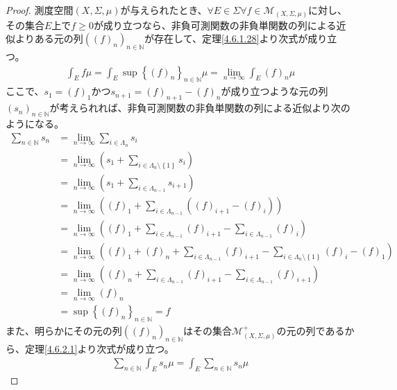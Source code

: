 \documentclass[dvipdfmx]{jsarticle}
\begin{document}
\begin{proof}
測度空間$(X,\varSigma,\mu)$が与えられたとき、$\forall E \in \varSigma\forall f \in \mathcal{M}_{(X,\varSigma,\mu)}$に対し、その集合$E$上で$f \geq 0$が成り立つなら、非負可測関数の非負単関数の列による近似よりある元の列$\left( (f)_{n} \right)_{n \in \mathbb{N}}$が存在して、定理\ref{4.6.1.28}より次式が成り立つ。
\begin{align*}
\int_{E} {f\mu} = \int_{E} {\sup\left\{ (f)_{n} \right\}_{n \in \mathbb{N}}\mu} = \lim_{n \rightarrow \infty}{\int_{E} {(f)_{n}\mu}}
\end{align*}
ここで、$s_{1} = (f)_{1}$かつ$s_{n + 1} = (f)_{n + 1} - (f)_{n}$が成り立つような元の列$\left( s_{n} \right)_{n \in \mathbb{N}}$が考えられれば、非負可測関数の非負単関数の列による近似より次のようになる。
\begin{align*}
\sum_{n \in \mathbb{N}} s_{n} &= \lim_{n \rightarrow \infty}{\sum_{i \in \varLambda_{n}} s_{i}}\\
&= \lim_{n \rightarrow \infty}\left( s_{1} + \sum_{i \in \varLambda_{n} \setminus \left\{ 1 \right\}} s_{i} \right)\\
&= \lim_{n \rightarrow \infty}\left( s_{1} + \sum_{i \in \varLambda_{n - 1}} s_{i + 1} \right)\\
&= \lim_{n \rightarrow \infty}\left( (f)_{1} + \sum_{i \in \varLambda_{n - 1}} \left( (f)_{i + 1} - (f)_{i} \right) \right)\\
&= \lim_{n \rightarrow \infty}\left( (f)_{1} + \sum_{i \in \varLambda_{n - 1}} (f)_{i + 1} - \sum_{i \in \varLambda_{n - 1}} (f)_{i} \right)\\
&= \lim_{n \rightarrow \infty}\left( (f)_{1} + (f)_{n} + \sum_{i \in \varLambda_{n - 1}} (f)_{i + 1} - \sum_{i \in \varLambda_{n} \setminus \left\{ 1 \right\}} (f)_{i} - (f)_{1} \right)\\
&= \lim_{n \rightarrow \infty}\left( (f)_{n} + \sum_{i \in \varLambda_{n - 1}} (f)_{i + 1} - \sum_{i \in \varLambda_{n - 1}} (f)_{i + 1} \right)\\
&= \lim_{n \rightarrow \infty}(f)_{n}\\
&= \sup\left\{ (f)_{n} \right\}_{n \in \mathbb{N}} = f
\end{align*}
また、明らかにその元の列$\left( (f)_{n} \right)_{n \in \mathbb{N}}$はその集合$\mathcal{M}_{(X,\varSigma,\mu)}^{+}$の元の列であるから、定理\ref{4.6.2.1}より次式が成り立つ。
\begin{align*}
\sum_{n \in \mathbb{N}} {\int_{E} {s_{n}\mu}} = \int_{E} {\sum_{n \in \mathbb{N}} s_{n}\mu}
\end{align*}
\end{proof}
\end{document}
